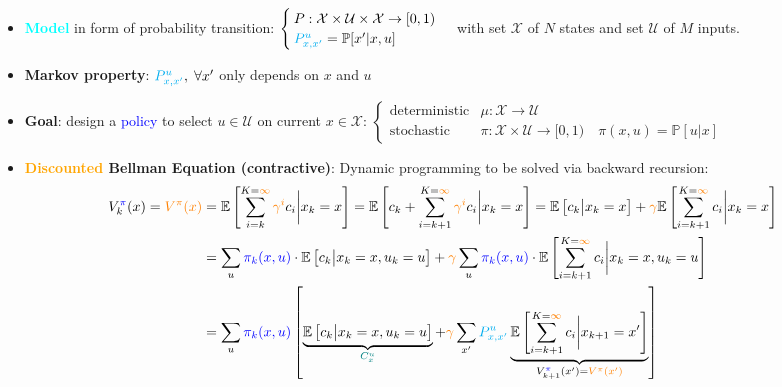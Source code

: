 \begin{itemize}
    \item \textbf{\textcolor{cyan}{Model}} in form of probability transition: 
    $\begin{cases} 
        P: \mathcal{X} \times \mathcal{U} \times \mathcal{X} \rightarrow [0,1) \\ 
        {\color{cyan}P^u_{x,x'}} = \mathbb{P}[x'|x,u]
    \end{cases}$ \quad with set $\mathcal{X}$ of $N$ states and set $\mathcal{U}$ of $M$ inputs.
    \item \textbf{Markov property}: ${\color{cyan}P^u_{x,x'}}, \; \forall x'$ only depends on $x$ and $u$
    \item \textbf{Goal}: design a \textcolor{blue}{policy} to select $u \in \mathcal{U}$ on current $x \in \mathcal{X}$: 
    $\begin{cases} 
        \text{deterministic} &\mu: \mathcal{X} \rightarrow \mathcal{U} \\ 
        \text{stochastic } &\pi: \mathcal{X} \times \mathcal{U} \rightarrow [0,1) \quad \pi(x,u) = \mathbb{P}[u|x]
    \end{cases}$
    \item \textbf{\textcolor{orange}{Discounted} Bellman Equation (contractive)}: Dynamic programming to be solved via backward recursion:
    \begin{align*}
        V^{\textcolor{blue}{\pi}}_{k}(x) = {\color{orange}V^{\pi}(x)} &= \mathbb{E} \left[ \sum_{i=k}^{K = {\color{orange}\infty}} {\color{orange}\gamma^i} c_i \bigg| x_k = x \right] = \mathbb{E} \left[ c_k + \sum_{i=k+1}^{K = {\color{orange}\infty}} {\color{orange}\gamma^i} c_i \bigg| x_k = x \right] = \mathbb{E} \left[ c_k \big| x_k = x \right] + {\color{orange}\gamma} \mathbb{E} \left[ \sum_{i=k+1}^{K = {\color{orange}\infty}} c_i \bigg| x_k = x \right] \\
        &= \sum_{u} \textcolor{blue}{\pi_k(x, u)} \cdot \mathbb{E} \left[ c_k \big| x_k = x, u_k = u \right] + {\color{orange}\gamma} \sum_{u} \textcolor{blue}{\pi_k(x, u)} \cdot \mathbb{E} \left[ \sum_{i=k+1}^{K = {\color{orange}\infty}} c_i \bigg| x_k = x, u_k = u \right] \\
        &= \sum_{u} \textcolor{blue}{\pi_k(x, u)} \left[ \underbrace{\mathbb{E} \left[ c_k \big| x_k = x, u_k = u \right]}_{\color{teal}{C^u_x}} + {\color{orange}\gamma} \sum_{x'} {\color{cyan}P^u_{x,x'}} \underbrace{\mathbb{E} \left[ \sum_{i=k+1}^{K = {\color{orange}\infty}} c_i \bigg| x_{k+1} = x' \right]}_{V^{\textcolor{blue}{\pi}}_{k+1}(x') = {\color{orange}V^{\pi}(x')}} \right]

\end{align*}
\end{itemize}
